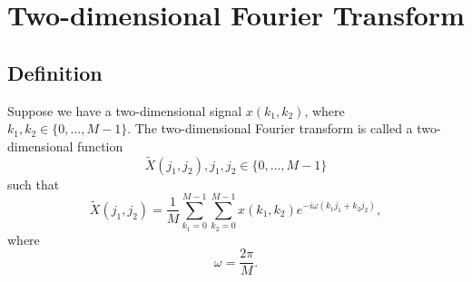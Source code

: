 \section{Two-dimensional Fourier Transform}
\subsection{Definition}

\begin{definition}
Suppose we have a two-dimensional signal $x\left(k_1, k_2\right)$, where 
$k_1,k_2 \in \{0, \dots, M - 1\}$. The two-dimensional Fourier transform
is called a two-dimensional function 
\[
\tilde{X}\left(j_1, j_2\right), j_1,j_2
\in \{0, \dots, M - 1\}
\]
such that
\[
\tilde{X}\left(j_1, j_2\right) = 
\frac{1}{M}\sum_{k_1 = 0}^{M-1}\sum_{k_2 = 0}^{M-1}
x\left(k_1, k_2\right)e^{-i \omega\left(k_1 j_1 + k_2 j_2\right)},
\]
where
\[
\omega = \frac{2 \pi}{M}.
\]
\label{def:add:dsp:fourier2d}
\end{definition}